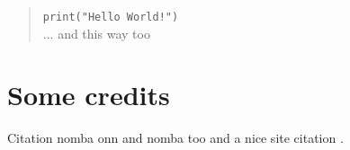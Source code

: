\documentclass[a4paper,12pt]{article}
\begin{document}
\begin{quotation}
    \small \texttt{print("Hello World!")} \\

    \normalsize ... and this way too
\end{quotation}

\section{Some credits}

Citation nomba onn \cite{dockerb} and nomba too \cite{dockera} and a nice site citation \cite{dockers}.


\end{document}
